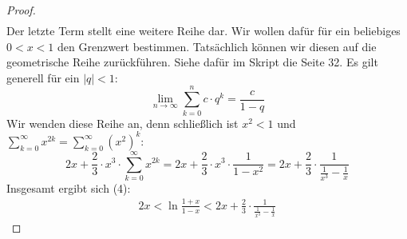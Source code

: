 \documentclass[10pt,fleqn]{article}
\theoremstyle{definition}
\theoremstyle{remark}
\begin{document}
\begin{proof}
\begin{align*}
    \end{align*}
    Der letzte Term stellt eine weitere Reihe dar. Wir wollen dafür für ein beliebiges \(0 < x < 1\) den Grenzwert bestimmen. Tatsächlich können wir diesen auf die geometrische Reihe zurückführen. Siehe dafür im Skript die Seite 32. Es gilt generell für ein \(|q| < 1\):
    \[
        \lim_{n\to\infty} \sum_{k=0}^n c \cdot q^k = \frac{c}{1-q}
    \]
    Wir wenden diese Reihe an, denn schließlich ist \(x^2 < 1\) und \(\sum_{k=0}^{\infty} x^{2k} = \sum_{k=0}^{\infty} (x^2)^k\):
    \[
        2 x + \frac{2}{3} \cdot x^3 \cdot \sum_{k=0}^{\infty} x^{2k} = 2x + \frac{2}{3} \cdot x^3 \cdot \frac{1}{1-x^2} = 2x + \frac{2}{3} \cdot \frac{1}{\frac{1}{x^3}-\frac{1}{x}}
    \]
    Insgesamt ergibt sich (4):
    \begin{align}
        2x < \ln{\frac{1+x}{1-x}} < 2x + \frac{2}{3} \cdot \frac{1}{\frac{1}{x^3}-\frac{1}{x}}
    \end{align}


\end{proof}
\end{document}
